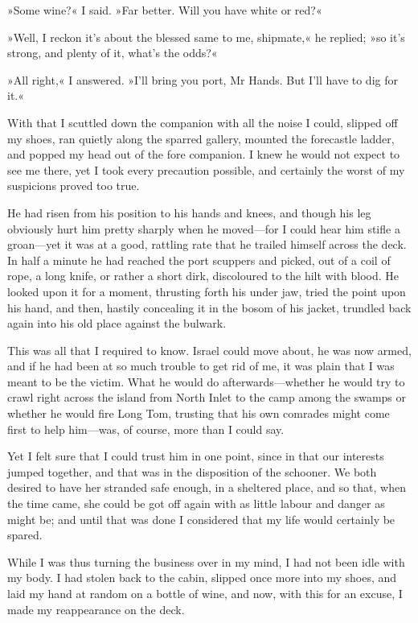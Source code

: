 »Some wine?« I said. »Far better. Will you have white or red?«

»Well, I reckon it's about the blessed same to me, shipmate,« he replied; »so it's strong, and plenty of it, what's the odds?«

»All right,« I answered. »I'll bring you port, Mr Hands. But I'll have to dig for it.«

With that I scuttled down the companion with all the noise I could, slipped off my shoes, ran quietly along the sparred gallery, mounted the forecastle ladder, and popped my head out of the fore companion. I knew he would not expect to see me there, yet I took every precaution possible, and certainly the worst of my suspicions proved too true.

He had risen from his position to his hands and knees, and though his leg obviously hurt him pretty sharply when he moved—for I could hear him stifle a groan—yet it was at a good, rattling rate that he trailed himself across the deck. In half a minute he had reached the port scuppers and picked, out of a coil of rope, a long knife, or rather a short dirk, discoloured to the hilt with blood. He looked upon it for a moment, thrusting forth his under jaw, tried the point upon his hand, and then, hastily concealing it in the bosom of his jacket, trundled back again into his old place against the bulwark.

This was all that I required to know. Israel could move about, he was now armed, and if he had been at so much trouble to get rid of me, it was plain that I was meant to be the victim. What he would do afterwards—whether he would try to crawl right across the island from North Inlet to the camp among the swamps or whether he would fire Long Tom, trusting that his own comrades might come first to help him—was, of course, more than I could say.

Yet I felt sure that I could trust him in one point, since in that our interests jumped together, and that was in the disposition of the schooner. We both desired to have her stranded safe enough, in a sheltered place, and so that, when the time came, she could be got off again with as little labour and danger as might be; and until that was done I considered that my life would certainly be spared.

While I was thus turning the business over in my mind, I had not been idle with my body. I had stolen back to the cabin, slipped once more into my shoes, and laid my hand at random on a bottle of wine, and now, with this for an excuse, I made my reappearance on the deck.

